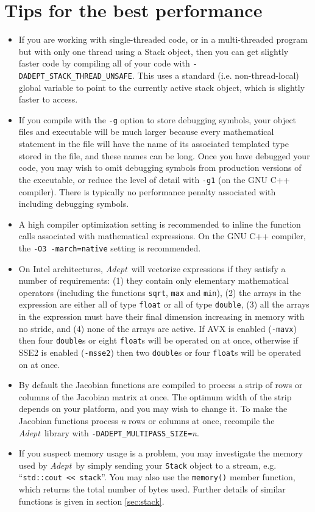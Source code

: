 \documentclass[a4,oneside]{book}
\def\codesize{\small}
\def\Adept{\emph{Adept}}
\def\code#1{{\codesize\texttt{#1}}}
\begin{document}
\section{Tips for the best performance}
\label{sec:tips}
\begin{itemize}
\item If you are working with single-threaded code, or in a
  multi-threaded program but with only one thread using a Stack
  object, then you can get slightly faster code by compiling all of
  your code with \code{-DADEPT\_STACK\_THREAD\_UNSAFE}. This uses a
  standard (i.e. non-thread-local) global variable to point to the
  currently active stack object, which is slightly faster to access.
\item If you compile with the \code{-g} option to store debugging
  symbols, your object files and executable will be much larger
  because every mathematical statement in the file will have the name
  of its associated templated type stored in the file, and these names
  can be long. Once you have debugged your code, you may wish to omit
  debugging symbols from production versions of the executable, or
  reduce the level of detail with \code{-g1} (on the GNU C++
  compiler).  There is typically no performance penalty associated
  with including debugging symbols.
\item A high compiler optimization setting is recommended to inline
  the function calls associated with mathematical expressions.  On the
  GNU C++ compiler, the \code{-O3 -march=native} setting is
  recommended.
\item On Intel architectures, \Adept\ will vectorize expressions if
  they satisfy a number of requirements: (1) they contain only
  elementary mathematical operators (including the functions
  \code{sqrt}, \code{max} and \code{min}), (2) the arrays in the
  expression are either all of type \code{float} or all of type
  \code{double}, (3) all the arrays in the expression must have their
  final dimension increasing in memory with no stride, and (4) none of
  the arrays are active. If AVX is enabled (\code{-mavx}) then four
  \code{double}s or eight \code{float}s will be operated on at once,
  otherwise if SSE2 is enabled (\code{-msse2}) then two \code{double}s
  or four \code{float}s will be operated on at once.
\item By default the Jacobian functions are compiled to process a
  strip of rows or columns of the Jacobian matrix at once. The optimum
  width of the strip depends on your platform, and you may wish to
  change it. To make the Jacobian functions process \textit{n} rows or
  columns at once, recompile the \Adept\ library with
  \code{-DADEPT\_MULTIPASS\_SIZE=}\textit{n}.
\item If you suspect memory usage is a problem, you may investigate
  the memory used by \Adept\ by simply sending your \code{Stack} object to a
  stream, e.g. ``\code{std::cout \textless\textless\ stack}''. You may
  also use the \code{memory()} member function, which returns the
  total number of bytes used. Further details of similar functions is
  given in section \ref{sec:stack}.
\end{itemize}
\end{document}
